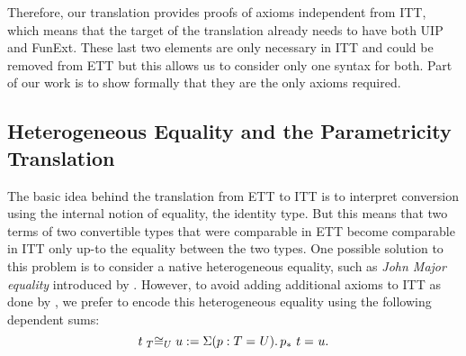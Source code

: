 Therefore, our translation provides proofs of axioms independent from
ITT, which means that the target of the translation already needs to
have both UIP and FunExt.
These last two elements are only necessary in ITT and could be removed from ETT
but this allows us to consider only one syntax for both.
%
Part of our work is to show formally that they are the only axioms
required.

\subsection{Heterogeneous Equality and the Parametricity Translation}
\label{sec:heteq}

The basic idea behind the translation from ETT to ITT is to interpret
conversion using the internal notion of equality, \ie the identity type.
%
But this means that two terms of two convertible types that were comparable
in ETT become comparable in ITT only up-to the equality between the
two types. One possible solution to this problem is to consider a
native heterogeneous equality, such as \emph{John Major
equality} introduced by \cite{mcbride2000dependently}.
%
However, to avoid adding additional axioms to ITT as done by
\cite{oury2005extensionality}, we prefer to encode this
heterogeneous equality using the following dependent sums:
$$\Heq{T}{t}{U}{u} := \Sum{p:\Eq{}{T}{U}} \Eq{}{\translpo{p}\ t}{u}.$$
%

